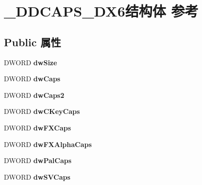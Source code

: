 \hypertarget{struct___d_d_c_a_p_s___d_x6}{}\section{\+\_\+\+D\+D\+C\+A\+P\+S\+\_\+\+D\+X6结构体 参考}
\label{struct___d_d_c_a_p_s___d_x6}
\subsection*{Public 属性}
\begin{DoxyCompactItemize}
\item 
\mbox{\label{struct___d_d_c_a_p_s___d_x6_aca5684d1e418fab1c99bd9427a0ab624}} 
D\+W\+O\+RD {\bfseries dw\+Size}
\item 
\mbox{\label{struct___d_d_c_a_p_s___d_x6_afb1987e35aa1b2110a72ce102f400e31}} 
D\+W\+O\+RD {\bfseries dw\+Caps}
\item 
\mbox{\label{struct___d_d_c_a_p_s___d_x6_a47f05bfaddbae105ab7df5f78ea08737}} 
D\+W\+O\+RD {\bfseries dw\+Caps2}
\item 
\mbox{\label{struct___d_d_c_a_p_s___d_x6_a4b3e542f315b91e5bffecdc1886cecc7}} 
D\+W\+O\+RD {\bfseries dw\+C\+Key\+Caps}
\item 
\mbox{\label{struct___d_d_c_a_p_s___d_x6_af82504c821cd51a3a11d82b7795a4af1}} 
D\+W\+O\+RD {\bfseries dw\+F\+X\+Caps}
\item 
\mbox{\label{struct___d_d_c_a_p_s___d_x6_a2805168b6c2bff962fdfb55f3838aa54}} 
D\+W\+O\+RD {\bfseries dw\+F\+X\+Alpha\+Caps}
\item 
\mbox{\label{struct___d_d_c_a_p_s___d_x6_a91f53200529901d3777146c22ad11a06}} 
D\+W\+O\+RD {\bfseries dw\+Pal\+Caps}
\item 
\mbox{\label{struct___d_d_c_a_p_s___d_x6_a06e9ccffff685c7c3d6ea59b69b91b81}} 
D\+W\+O\+RD {\bfseries dw\+S\+V\+Caps}
\item 
\mbox{\label{struct___d_d_c_a_p_s___d_x6_a1148ed1f5de13ff4b92cac359d4cbc1b}} 

\end{DoxyCompactItemize}
